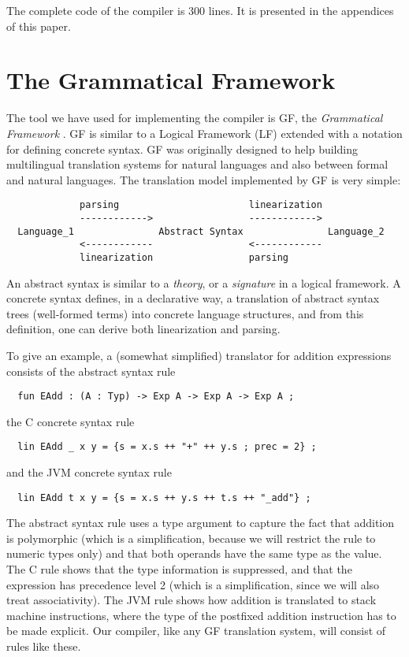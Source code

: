 \documentclass[12pt]{article}
\newcommand{\empha}[1]{{\em #1}}
\begin{document}
The complete code of the compiler is 300 lines. It is presented in 
the appendices of this paper.



\section{The Grammatical Framework}

The tool we have used for implementing the compiler is
GF, the \empha{Grammatical Framework} \cite{gf-jfp}. GF 
is similar to a Logical Framework (LF) 
\cite{harper-honsell}
extended with
a notation for defining concrete syntax. GF was originally
designed to help building multilingual
translation systems for natural languages and also
between formal and natural languages. The translation model
implemented by GF is very simple:
\begin{verbatim}
             parsing                       linearization
             ------------>                 ------------>
  Language_1               Abstract Syntax               Language_2
             <------------                 <------------
             linearization                 parsing
\end{verbatim}
An abstract syntax is similar to a \empha{theory}, or a
\empha{signature} in a logical framework. A 
concrete syntax defines, in a declarative way,
a translation of abstract syntax trees (well-formed terms) 
into concrete language structures, and from this definition, one can
derive both linearization and parsing. 

To give an example,
a (somewhat simplified) translator for addition expressions
consists of the abstract syntax rule
\begin{verbatim}
  fun EAdd : (A : Typ) -> Exp A -> Exp A -> Exp A ;
\end{verbatim}
the C concrete syntax rule
\begin{verbatim}
  lin EAdd _ x y = {s = x.s ++ "+" ++ y.s ; prec = 2} ;
\end{verbatim}
and the JVM concrete syntax rule
\begin{verbatim}
  lin EAdd t x y = {s = x.s ++ y.s ++ t.s ++ "_add"} ;
\end{verbatim}
The abstract syntax rule uses a type argument to capture
the fact that addition is polymorphic (which is a simplification,
because we will restrict the rule to numeric types only)
and that both operands have the same type as the value.
The C rule shows that the type information is suppressed,
and that the expression has precedence level 2 (which is a simplification,
since we will also treat associativity).
The JVM rule shows how addition is translated to stack machine
instructions, where the type of the postfixed addition instruction has to
be made explicit. Our compiler, like any GF translation system, will
consist of rules like these.
\end{document}

